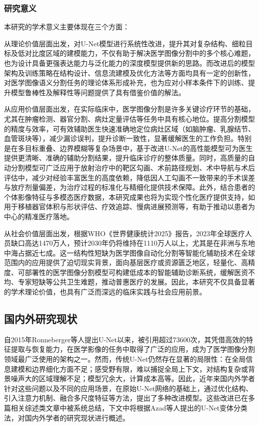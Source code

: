 \subsubsection{研究意义}

本研究的学术意义主要体现在三个方面：

从理论价值层面出发，对U-Net模型进行系统性改进，提升其对复杂结构、细粒目标及低对比度区域的建模能力，不仅有助于解决医学图像分割中的多个核心难题，也为设计具备更强表达能力与泛化能力的深度模型提供新的思路。而改进后的模型架构及训练策略在结构设计、信息流建模及优化方法等方面均具有一定的创新性，对医学图像语义分割任务的理论体系形成补充，也为应对小样本条件下的训练、提升模型鲁棒性及解释性等问题提供了具有借鉴价值的解法。

从应用价值层面出发，在实际临床中，医学图像分割是许多关键诊疗环节的基础，尤其在肿瘤检测、器官分割、病灶定量评估等任务中具有核心地位。提高分割模型的精度与效率，可有效辅助医生快速准确地定位病灶区域（如脑肿瘤、乳腺结节、血管斑块等），减少漏诊误判，提升诊断一致性，显著缓解医生的工作负担。特别是在多目标重叠、边界模糊等复杂场景中，基于改进U-Net的高性能模型可为医生提供更清晰、准确的辅助分割结果，提升临床诊疗的整体质量。同时，高质量的自动分割模型可广泛应用于放射治疗中的靶区勾画、术前路径规划、术中导航与术后评估中，减少对经验丰富医生的高度依赖，降低因人工勾画不一致带来的手术误差与放疗剂量偏差，为治疗过程的标准化与精细化提供技术保障。此外，结合患者的个体影像特征与多模态医疗数据，本研究成果也将为实现个性化医疗提供支持，如用于移植器官体积与形状评估、疗效追踪、慢病进展预测等，有助于推动以患者为中心的精准医疗落地。

从社会价值层面出发，根据WHO《世界健康统计2025》报告\cite{who2021stats}，2023年全球医疗人员缺口高达1470万人，预计2030年仍将维持在1110万人以上，尤其是在非洲与东地中海占据近七成。这一结构性短缺为医学图像自动化分割等智能化辅助技术在全球范围内的应用提供了迫切现实背景，面向基层医疗或资源匮乏地区，轻量化、高精度、可部署性的医学图像分割模型可构建低成本的智能辅助诊断系统，缓解医资不均、专家短缺等公共卫生难题，推动普惠医疗的发展。因此，本研究不仅具备显著的学术理论价值，也具有广泛而深远的临床实践与社会应用前景。


\subsection{国内外研究现状}

自2015年Ronneberger等人提出U-Net以来，被引用超过73600次，其凭借高效的特征提取与恢复能力，在医学影像的任务中取得了广泛的应用，成为了医学图像分割领域最广泛使用的架构之一。然而，传统U-Net仍然存在显著的局限性：在全局信息建模和边界细化方面不足；感受野有限，难以捕捉全局上下文，对结构复杂或背景噪声大的区域理解不足；模型冗余大，计算成本高等。因此，近年来国内外学者针对这些问题以及不同的应用场景，在原始U-Net网络的基础上，通过优化结构、引入注意力机制、融合多尺度特征等方法，提出了多种改进模型。这些改进已在多篇相关综述类文章中被系统总结\cite{azad2024,krithikaaliasanbudevi2022,wang2023}，下文中将根据Azad等人提出的U-Net变体分类法\cite{azad2024}，对国内外学者的研究现状进行概述。


